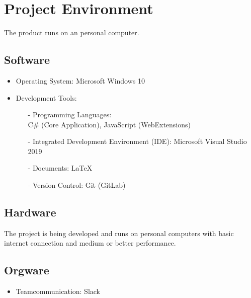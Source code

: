 \chapter{Project Environment}
\label{ch:environment}

The product runs on an personal computer.

\section{Software}
\begin{itemize}
\item Operating System: Microsoft Windows 10

\item Development Tools:
	\begin{itemize}
	\item[-] Programming Languages: \\C\# (Core Application), JavaScript (WebExtensions)
	\item[-] Integrated Development Environment (IDE): Microsoft Visual Studio 2019
	\item[-] Documents: LaTeX
	\item[-] Version Control: Git (GitLab)
	\end{itemize}
\end{itemize}
\section{Hardware}

The project is being developed and runs on personal computers with basic internet connection and medium or better performance.

\section{Orgware}
\begin{itemize}
\item Teamcommunication: Slack
\end{itemize}